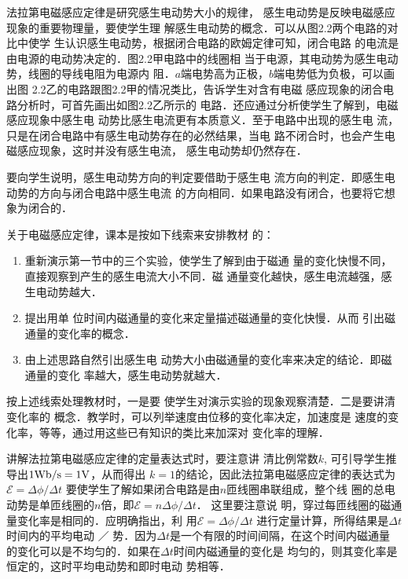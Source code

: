 法拉第电磁感应定律是研究感生电动势大小的规律，
感生电动势是反映电磁感应现象的重要物理量，要使学生理
解感生电动势的概念．可以从图2.2两个电路的对比中使学
生认识感生电动势，根据闭合电路的欧姆定律可知，闭合电路
的电流是由电源的电动势决定的．图2.2甲电路中的线圈相
当于电源，其电动势为感生电动势，线圈的导线电阻为电源内
阻．$a$端电势高为正极，$b$端电势低为负极，可以画出图
2.2乙的电路跟图2.2甲的情况类比，告诉学生对含有电磁
感应现象的闭合电路分析时，可首先画出如图2.2乙所示的
电路．还应通过分析使学生了解到，电磁感应现象中感生电
动势比感生电流更有本质意义．至于电路中出现的感生电
流，只是在闭合电路中有感生电动势存在的必然结果，当电
路不闭合时，也会产生电磁感应现象，这时并没有感生电流，
感生电动势却仍然存在．

要向学生说明，感生电动势方向的判定要借助于感生电
流方向的判定．即感生电动势的方向与闭合电路中感生电流
的方向相同．如果电路没有闭合，也要将它想象为闭合的．

关于电磁感应定律，课本是按如下线索来安排教材
的：
\begin{enumerate}
\item 重新演示第一节中的三个实验，使学生了解到由于磁通
量的变化快慢不同，直接观察到产生的感生电流大小不同．磁
通量变化越快，感生电流越强，感生电动势越大．    \item 提出用单
位时间内磁通量的变化来定量描述磁通量的变化快慢．从而
引出磁通量的变化率的概念．    \item 由上述思路自然引出感生电
动势大小由磁通量的变化率来决定的结论．即磁通量的变化
率越大，感生电动势就越大．
\end{enumerate}
按上述线索处理教材时，一是要
使学生对演示实验的现象观察清楚．二是要讲清变化率的
概念．教学时，可以列举速度由位移的变化率决定，加速度是
速度的变化率，等等，通过用这些已有知识的类比来加深对
变化率的理解．

讲解法拉第电磁感应定律的定量表达式时，要注意讲
清比例常数$k$, 可引导学生推导出$1{\rm Wb/s}=1{\rm V}$，从而得出
$k=1$的结论，因此法拉第电磁感应定律的表达式为$\mathcal{E}=\Delta\phi/\Delta t$
要使学生了解如果闭合电路是由$n$匝线圈串联组成，整个线
圈的总电动势是单匝线圈的$n$倍，即$\mathcal{E}=n\Delta\phi/\Delta t$．
这里要注意说
明，穿过每匝线圈的磁通量变化率是相同的．应明确指出，利
用$\mathcal{E}=\Delta\phi/\Delta t$
进行定量计算，所得结果是$\Delta t$时间内的平均电动
／
势．因为$\Delta t$是一个有限的时间间隔，在这个时间内磁通量
的变化可以是不均匀的．如果在$\Delta t$时间内磁通量的变化是
均匀的，则其变化率是恒定的，这时平均电动势和即时电动
势相等．

